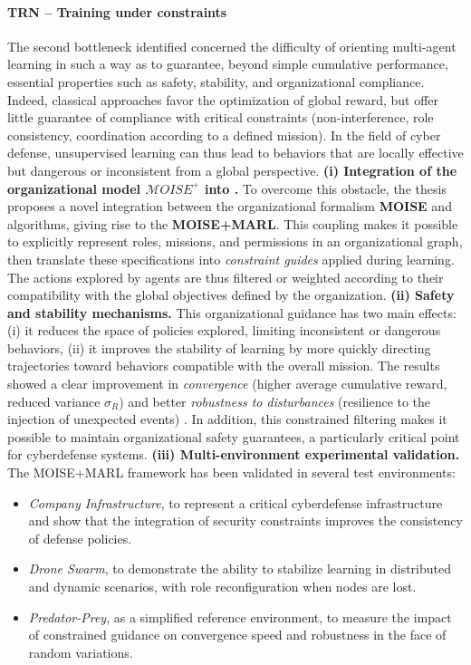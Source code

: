 \paragraph{TRN – Training under constraints}
The second bottleneck identified concerned the difficulty of orienting multi-agent learning in such a way as to guarantee, beyond simple cumulative performance, essential properties such as safety, stability, and organizational compliance.
Indeed, classical  approaches favor the optimization of global reward, but offer little guarantee of compliance with critical constraints (non-interference, role consistency, coordination according to a defined mission).
In the field of cyber defense, unsupervised learning can thus lead to behaviors that are locally effective but dangerous or inconsistent from a global perspective.
\medskip
\noindent
\textbf{(i) Integration of the organizational model $\mathcal{M}OISE^+$ into .}
To overcome this obstacle, the thesis proposes a novel integration between the organizational formalism \textbf{MOISE} and  algorithms, giving rise to the \textbf {MOISE+MARL}.
This coupling makes it possible to explicitly represent roles, missions, and permissions in an organizational graph, then translate these specifications into \textit{constraint guides} applied during learning.
The actions explored by agents are thus filtered or weighted according to their compatibility with the global objectives defined by the organization.
\medskip
\noindent
\textbf{(ii) Safety and stability mechanisms.}
This organizational guidance has two main effects:
(i) it reduces the space of policies explored, limiting inconsistent or dangerous behaviors,
(ii) it improves the stability of learning by more quickly directing trajectories toward behaviors compatible with the overall mission.
The results showed a clear improvement in \textit{convergence} (higher average cumulative reward, reduced variance $\sigma_R$) and better \textit{robustness to disturbances} (resilience to the injection of unexpected events) .
In addition, this constrained filtering makes it possible to maintain organizational safety guarantees, a particularly critical point for cyberdefense systems.
\medskip
\noindent
\textbf{(iii) Multi-environment experimental validation.}
The MOISE+MARL framework has been validated in several test environments:
\begin{itemize}
  \item \textit{Company Infrastructure}, to represent a critical cyberdefense infrastructure and show that the integration of security constraints improves the consistency of defense policies.

  \item \textit{Drone Swarm}, to demonstrate the ability to stabilize learning in distributed and dynamic scenarios, with role reconfiguration when nodes are lost.
  \item \textit{Predator-Prey}, as a simplified reference environment, to measure the impact of constrained guidance on convergence speed and robustness in the face of random variations.
\end{itemize}
